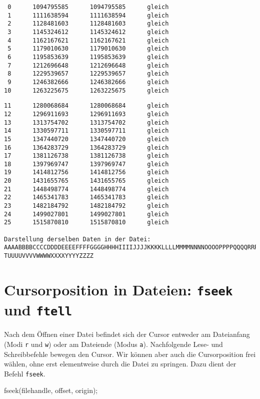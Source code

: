 \begin{cmdbox}
\begin{verbatim}
 0      1094795585      1094795585      gleich
 1      1111638594      1111638594      gleich
 2      1128481603      1128481603      gleich
 3      1145324612      1145324612      gleich
 4      1162167621      1162167621      gleich
 5      1179010630      1179010630      gleich
 6      1195853639      1195853639      gleich
 7      1212696648      1212696648      gleich
 8      1229539657      1229539657      gleich
 9      1246382666      1246382666      gleich
10      1263225675      1263225675      gleich
\end{verbatim}
\end{cmdbox}
%
\begin{cmdbox}[]
\begin{verbatim}
11      1280068684      1280068684      gleich
12      1296911693      1296911693      gleich
13      1313754702      1313754702      gleich
14      1330597711      1330597711      gleich
15      1347440720      1347440720      gleich
16      1364283729      1364283729      gleich
17      1381126738      1381126738      gleich
18      1397969747      1397969747      gleich
19      1414812756      1414812756      gleich
20      1431655765      1431655765      gleich
21      1448498774      1448498774      gleich
22      1465341783      1465341783      gleich
23      1482184792      1482184792      gleich
24      1499027801      1499027801      gleich
25      1515870810      1515870810      gleich

Darstellung derselben Daten in der Datei:
AAAABBBBCCCCDDDDEEEEFFFFGGGGHHHHIIIIJJJJKKKKLLLLMMMMNNNNOOOOPPPPQQQQRRRRSSSSTTT
TUUUUVVVVWWWWXXXXYYYYZZZZ
\end{verbatim}
\end{cmdbox}

\section{Cursorposition in Dateien: \texttt{fseek} und \texttt{ftell}}
Nach dem Öffnen einer Datei befindet sich der Cursor entweder am Dateianfang (Modi \texttt{r} und \texttt{w}) oder am Dateiende (Modus \texttt{a}). Nachfolgende Lese- und Schreibbefehle bewegen den Cursor. Wir können aber auch die Cursorposition frei wählen, ohne erst elementweise durch die Datei zu springen. Dazu dient der Befehl \texttt{fseek}.

\begin{codebox}
fseek(filehandle, offset, origin);
\end{codebox}

